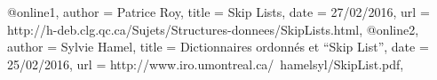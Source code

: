 \documentclass[hidelinks,a4paper, 12pt]{article}
\begin{document}
	
	@online{1,
		author = {Patrice Roy},
		title = {Skip Lists},
		date = {27/02/2016},
		url = {http://h-deb.clg.qc.ca/Sujets/Structures-donnees/SkipLists.html},
	}
	@online{2,
		author = {Sylvie Hamel},
		title = {Dictionnaires ordonnés et “Skip List”},
		date = {25/02/2016},
		url = {http://www.iro.umontreal.ca/~hamelsyl/SkipList.pdf},
	}
	
\end{document}
